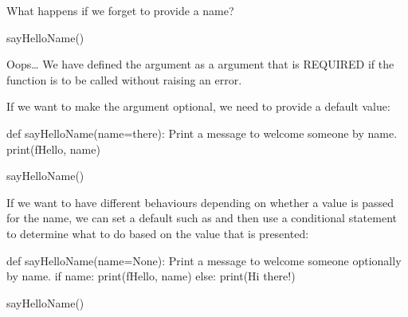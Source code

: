 \documentclass[letterpaper,10pt,english]{sphinxmanual}
\begin{document}
What happens if we forget to provide a name?

{
\begin{sphinxVerbatim}[commandchars=\\\{\}]
\llap{\color{nbsphinxin}[ ]:\,\hspace{\fboxrule}\hspace{\fboxsep}}sayHelloName()
\end{sphinxVerbatim}
}

Oops… We have defined the argument as a  argument that is REQUIRED if the function is to be called without raising an error.

If we want to make the argument optional, we need to provide a default value:

{
\begin{sphinxVerbatim}[commandchars=\\\{\}]
\llap{\color{nbsphinxin}[ ]:\,\hspace{\fboxrule}\hspace{\fboxsep}}def sayHelloName(name=\PYGZsq{}there\PYGZsq{}):
    \PYGZdq{}\PYGZdq{}\PYGZdq{}Print a message to welcome someone by name.\PYGZdq{}\PYGZdq{}\PYGZdq{}
    print(f\PYGZdq{}Hello, \PYGZob{}name\PYGZcb{}\PYGZdq{})

sayHelloName()
\end{sphinxVerbatim}
}

If we want to have different behaviours depending on whether a value is passed for the name, we can set a default such as  and then use a conditional statement to determine what to do based on the value that is presented:

{
\begin{sphinxVerbatim}[commandchars=\\\{\}]
\llap{\color{nbsphinxin}[ ]:\,\hspace{\fboxrule}\hspace{\fboxsep}}def sayHelloName(name=None):
    \PYGZdq{}\PYGZdq{}\PYGZdq{}Print a message to welcome someone optionally by name.\PYGZdq{}\PYGZdq{}\PYGZdq{}
    if name:
        print(f\PYGZdq{}Hello, \PYGZob{}name\PYGZcb{}\PYGZdq{})
    else:
        print(\PYGZdq{}Hi there!\PYGZdq{})

sayHelloName()
\end{sphinxVerbatim}
}
\end{document}
